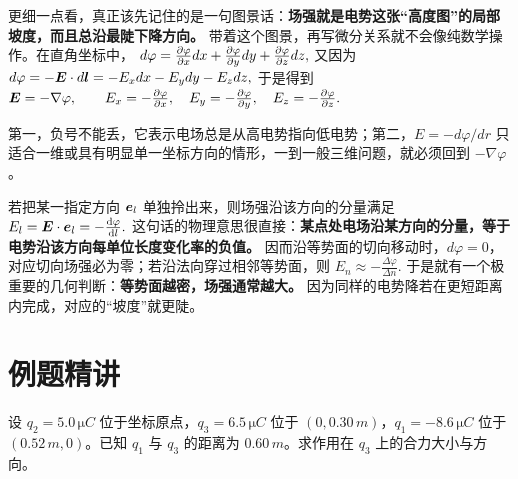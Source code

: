 \documentclass[lang=cn,11pt]{elegantbook}
\begin{document}
更细一点看，真正该先记住的是一句图景话：\textbf{场强就是电势这张“高度图”的局部坡度，而且总沿最陡下降方向。} 带着这个图景，再写微分关系就不会像纯数学操作。在直角坐标中，
 \(d\varphi=\pdv{\varphi}{x}dx+\pdv{\varphi}{y}dy+\pdv{\varphi}{z}dz,\) 
又因为
 \(d\varphi=-\vb*{E}\cdot d\vb*{l} =-E_xdx-E_ydy-E_zdz,\) 
于是得到
 \(\vb*{E}=-\nabla \varphi, \qquad E_x=-\pdv{\varphi}{x},\quad E_y=-\pdv{\varphi}{y},\quad E_z=-\pdv{\varphi}{z}.\) 

\begin{note}
 第一，负号不能丢，它表示电场总是从高电势指向低电势；第二，\(E=-d\varphi/dr\) 只适合一维或具有明显单一坐标方向的情形，一到一般三维问题，就必须回到 \(-\nabla\varphi\)。
\end{note}

\begin{remark}
若把某一指定方向 \(\vb*{e}_l\) 单独拎出来，则场强沿该方向的分量满足
 \(E_l=\vb*{E}\cdot \vb*{e}_l=-\dv{\varphi}{l}.\) 
这句话的物理意思很直接：\textbf{某点处电场沿某方向的分量，等于电势沿该方向每单位长度变化率的负值。} 因而沿等势面的切向移动时，\(d\varphi=0\)，对应切向场强必为零；若沿法向穿过相邻等势面，则
 \(E_n\approx -\frac{\Delta\varphi}{\Delta n}.\) 
于是就有一个极重要的几何判断：\textbf{等势面越密，场强通常越大。} 因为同样的电势降若在更短距离内完成，对应的“坡度”就更陡。
\end{remark}

\section{例题精讲}

\begin{exercise}[三点电荷合力的矢量叠加]
设 \(q_2=5.0\,\si{\micro C}\) 位于坐标原点，\(q_3=6.5\,\si{\micro C}\) 位于 \((0,0.30\,\si{m})\)，\(q_1=-8.6\,\si{\micro C}\) 位于 \((0.52\,\si{m},0)\)。已知 \(q_1\) 与 \(q_3\) 的距离为 \(0.60\,\si{m}\)。求作用在 \(q_3\) 上的合力大小与方向。
\end{exercise}
\end{document}

